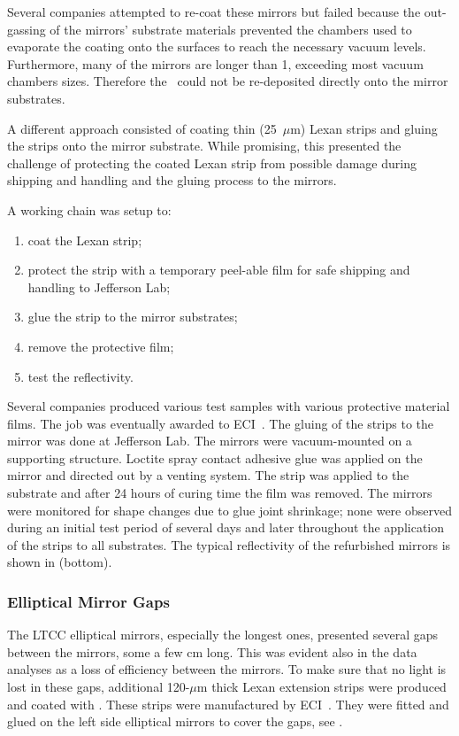 Several companies attempted to re-coat these mirrors but failed because the out-gassing of the mirrors' substrate materials
prevented the chambers used to evaporate the coating onto the surfaces to reach the necessary vacuum levels.
Furthermore, many of the mirrors are longer than 1, exceeding most vacuum chambers sizes. Therefore the \coating\
could not be re-deposited directly onto the mirror substrates.

A different approach consisted of coating thin (25~$\mu$m) Lexan strips and gluing the strips onto the mirror
substrate. While promising, this presented the challenge of protecting the coated Lexan strip from possible
damage during shipping and handling and the gluing process to the mirrors.

A working chain was setup to:

\begin{enumerate}
	\item coat the Lexan strip;
	\item protect the strip with a temporary peel-able film for safe shipping and handling to Jefferson Lab;
	\item glue the strip to the mirror substrates;
	\item remove the protective film;
	\item test the reflectivity.
\end{enumerate}

Several companies produced various test samples with various protective material films. The job was eventually awarded
to ECI~\cite{ECI}. The gluing of the strips to the mirror was done at Jefferson Lab. The mirrors were vacuum-mounted
on a supporting structure. Loctite spray contact adhesive glue was applied on the mirror and directed out by a venting
system. The strip was applied to the substrate and after 24 hours of curing time the film was removed.
The mirrors were monitored for shape changes due to glue joint shrinkage; none were observed during an initial test
period of several days and later throughout the application of the strips to all substrates.
The typical reflectivity of the refurbished mirrors is shown in  (bottom).

\subsubsection{Elliptical Mirror Gaps}

The LTCC elliptical mirrors, especially the longest ones, presented several gaps between the mirrors, some a few
cm long. This was evident also in the data analyses as a loss of efficiency between the mirrors. To make sure that
no light is lost in these gaps, additional 120-$\mu$m thick Lexan extension strips were produced and coated with
\coating. These strips were manufactured by ECI~\cite{ECI}. They were fitted and glued on the left side
elliptical mirrors to cover the gaps, see \F{gapBeforeAndAfter}.

